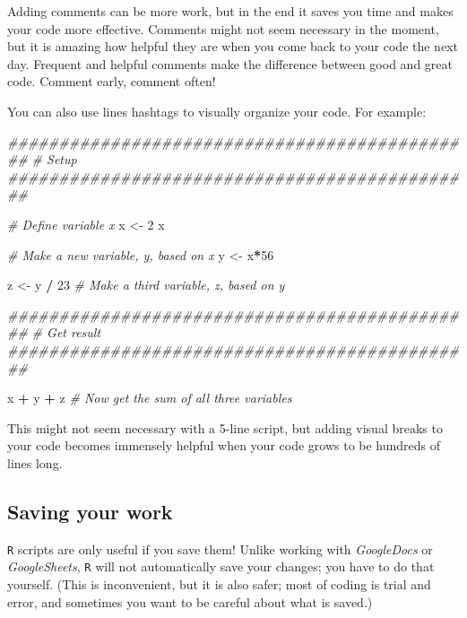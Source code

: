 \documentclass[
]{book}
\newenvironment{Shaded}{\begin{snugshade}}{\end{snugshade}}
\newcommand{\CommentTok}[1]{\textcolor[rgb]{0.56,0.35,0.01}{\textit{#1}}}
\newcommand{\DecValTok}[1]{\textcolor[rgb]{0.00,0.00,0.81}{#1}}
\newcommand{\NormalTok}[1]{#1}
\newcommand{\OperatorTok}[1]{\textcolor[rgb]{0.81,0.36,0.00}{\textbf{#1}}}
\newcommand{\StringTok}[1]{\textcolor[rgb]{0.31,0.60,0.02}{#1}}
\begin{document}
Adding comments can be more work, but in the end it saves you time and makes your code more effective. Comments might not seem necessary in the moment, but it is amazing how helpful they are when you come back to your code the next day. Frequent and helpful comments make the difference between good and great code. Comment early, comment often!

You can also use lines hashtags to visually organize your code. For example:

\begin{Shaded}
\begin{Highlighting}[]
\CommentTok{##############################################}
\CommentTok{# Setup}
\CommentTok{##############################################}

\CommentTok{# Define variable x}
\NormalTok{x <-}\StringTok{ }\DecValTok{2} 
\NormalTok{x}

\CommentTok{# Make a new variable, y, based on x}
\NormalTok{y <-}\StringTok{ }\NormalTok{x}\OperatorTok{*}\DecValTok{56}

\NormalTok{z <-}\StringTok{ }\NormalTok{y }\OperatorTok{/}\StringTok{ }\DecValTok{23} \CommentTok{# Make a third variable, z, based on y}
 

\CommentTok{##############################################}
\CommentTok{# Get result}
\CommentTok{##############################################}

\NormalTok{x }\OperatorTok{+}\StringTok{ }\NormalTok{y }\OperatorTok{+}\StringTok{ }\NormalTok{z }\CommentTok{# Now get the sum of all three variables}
\end{Highlighting}
\end{Shaded}

This might not seem necessary with a 5-line script, but adding visual breaks to your code becomes immensely helpful when your code grows to be hundreds of lines long.

\hypertarget{saving-your-work}{%
\subsection*{Saving your work}\label{saving-your-work}}

\texttt{R} scripts are only useful if you save them! Unlike working with \emph{GoogleDocs} or \emph{GoogleSheets}, \texttt{R} will not automatically save your changes; you have to do that yourself. (This is inconvenient, but it is also safer; most of coding is trial and error, and sometimes you want to be careful about what is saved.)
\end{document}
